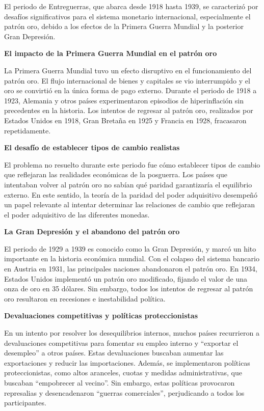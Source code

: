 \documentclass[
  letterpaper,
  DIV=11,
  numbers=noendperiod]{scrartcl}
\begin{document}
El periodo de Entreguerras, que abarca desde 1918 hasta 1939, se
caracterizó por desafíos significativos para el sistema monetario
internacional, especialmente el patrón oro, debido a los efectos de la
Primera Guerra Mundial y la posterior Gran Depresión.

\textbf{El impacto de la Primera Guerra Mundial en el patrón oro}

La Primera Guerra Mundial tuvo un efecto disruptivo en el funcionamiento
del patrón oro. El flujo internacional de bienes y capitales se vio
interrumpido y el oro se convirtió en la única forma de pago externo.
Durante el periodo de 1918 a 1923, Alemania y otros países
experimentaron episodios de hiperinflación sin precedentes en la
historia. Los intentos de regresar al patrón oro, realizados por Estados
Unidos en 1918, Gran Bretaña en 1925 y Francia en 1928, fracasaron
repetidamente.

\textbf{El desafío de establecer tipos de cambio realistas}

El problema no resuelto durante este periodo fue cómo establecer tipos
de cambio que reflejaran las realidades económicas de la posguerra. Los
países que intentaban volver al patrón oro no sabían qué paridad
garantizaría el equilibrio externo. En este sentido, la teoría de la
paridad del poder adquisitivo desempeñó un papel relevante al intentar
determinar las relaciones de cambio que reflejaran el poder adquisitivo
de las diferentes monedas.

\textbf{La Gran Depresión y el abandono del patrón} \textbf{oro}

El periodo de 1929 a 1939 es conocido como la Gran Depresión, y marcó un
hito importante en la historia económica mundial. Con el colapso del
sistema bancario en Austria en 1931, las principales naciones
abandonaron el patrón oro. En 1934, Estados Unidos implementó un patrón
oro modificado, fijando el valor de una onza de oro en 35 dólares. Sin
embargo, todos los intentos de regresar al patrón oro resultaron en
recesiones e inestabilidad política.

\textbf{Devaluaciones competitivas y políticas proteccionistas}

En un intento por resolver los desequilibrios internos, muchos países
recurrieron a devaluaciones competitivas para fomentar su empleo interno
y ``exportar el desempleo'' a otros países. Estas devaluaciones buscaban
aumentar las exportaciones y reducir las importaciones. Además, se
implementaron políticas proteccionistas, como altos aranceles, cuotas y
medidas administrativas, que buscaban ``empobrecer al vecino''. Sin
embargo, estas políticas provocaron represalias y desencadenaron
``guerras comerciales'', perjudicando a todos los participantes.
\end{document}
